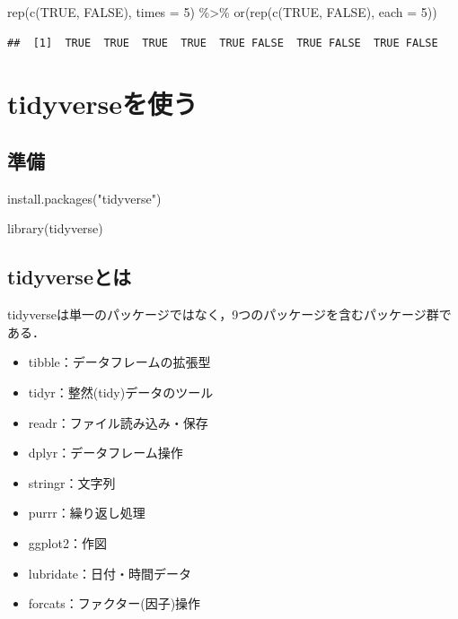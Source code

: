 \documentclass[
]{article}
\newenvironment{Shaded}{\begin{snugshade}}{\end{snugshade}}
\newcommand{\AttributeTok}[1]{\textcolor[rgb]{0.77,0.63,0.00}{#1}}
\newcommand{\ConstantTok}[1]{\textcolor[rgb]{0.00,0.00,0.00}{#1}}
\newcommand{\DecValTok}[1]{\textcolor[rgb]{0.00,0.00,0.81}{#1}}
\newcommand{\FunctionTok}[1]{\textcolor[rgb]{0.00,0.00,0.00}{#1}}
\newcommand{\NormalTok}[1]{#1}
\newcommand{\SpecialCharTok}[1]{\textcolor[rgb]{0.00,0.00,0.00}{#1}}
\newcommand{\StringTok}[1]{\textcolor[rgb]{0.31,0.60,0.02}{#1}}
\providecommand{\tightlist}{%
  \setlength{\itemsep}{0pt}\setlength{\parskip}{0pt}}
\begin{document}
\begin{Shaded}
\begin{Highlighting}[]
\FunctionTok{rep}\NormalTok{(}\FunctionTok{c}\NormalTok{(}\ConstantTok{TRUE}\NormalTok{, }\ConstantTok{FALSE}\NormalTok{), }\AttributeTok{times =} \DecValTok{5}\NormalTok{) }\SpecialCharTok{\%\textgreater{}\%}
  \FunctionTok{or}\NormalTok{(}\FunctionTok{rep}\NormalTok{(}\FunctionTok{c}\NormalTok{(}\ConstantTok{TRUE}\NormalTok{, }\ConstantTok{FALSE}\NormalTok{), }\AttributeTok{each =} \DecValTok{5}\NormalTok{))}
\end{Highlighting}
\end{Shaded}

\begin{verbatim}
##  [1]  TRUE  TRUE  TRUE  TRUE  TRUE FALSE  TRUE FALSE  TRUE FALSE
\end{verbatim}

\hypertarget{tidyverse}{%
\section{tidyverseを使う}\label{tidyverse}}

\hypertarget{ux6e96ux5099-1}{%
\subsection{準備}\label{ux6e96ux5099-1}}

\begin{Shaded}
\begin{Highlighting}[]
\FunctionTok{install.packages}\NormalTok{(}\StringTok{"tidyverse"}\NormalTok{)}
\end{Highlighting}
\end{Shaded}

\begin{Shaded}
\begin{Highlighting}[]
\FunctionTok{library}\NormalTok{(tidyverse)}
\end{Highlighting}
\end{Shaded}

\hypertarget{tidyverseux3068ux306f}{%
\subsection{tidyverseとは}\label{tidyverseux3068ux306f}}

tidyverseは単一のパッケージではなく，9つのパッケージを含むパッケージ群である．

\begin{itemize}
\tightlist
\item
  tibble：データフレームの拡張型
\item
  tidyr：整然(tidy)データのツール
\item
  readr：ファイル読み込み・保存
\item
  dplyr：データフレーム操作
\item
  stringr：文字列
\item
  purrr：繰り返し処理
\item
  ggplot2：作図
\item
  lubridate：日付・時間データ
\item
  forcats：ファクター(因子)操作
\end{itemize}
\end{document}
